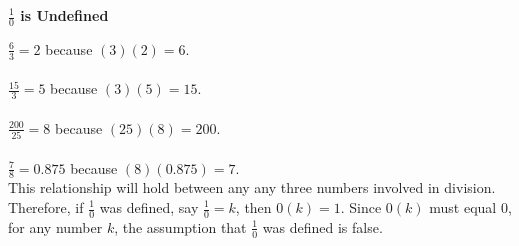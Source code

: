 \documentclass[12pt]{article}
\begin{document}
\begin{center}
\Large{\textbf{$\frac{1}{0}$ is Undefined }}
\end{center}
$\frac{6}{3} = 2$ because $(3)(2)=6$.\\\\
$\frac{15}{3} = 5$ because $(3)(5)=15$.\\\\
$\frac{200}{25} = 8$ because $(25)(8)=200$.\\\\
$\frac{7}{8} = 0.875$ because $(8)(0.875)=7$.\\

This relationship will hold between any any three numbers involved in division. Therefore, 
if $\frac{1}{0}$ was defined, say $\frac{1}{0} = k$, then $0(k)=1$. Since $0(k)$ must
equal $0$, for any number $k$, the assumption that  $\frac{1}{0}$ was defined is false.
\end{document}
